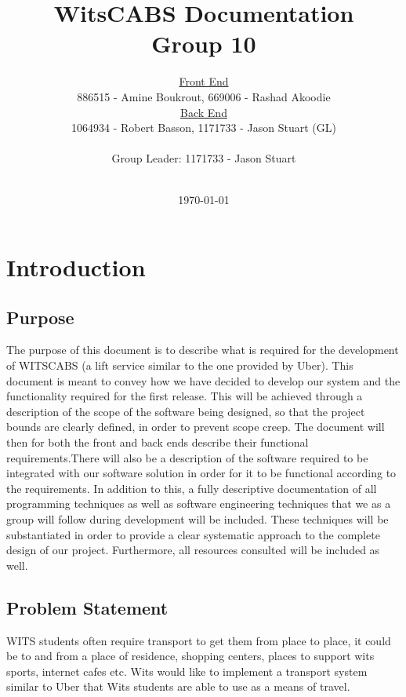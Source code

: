 \documentclass[a4paper,12pt]{article}
\begin{document}
\title{WitsCABS Documentation\\Group 10}
\author{\underline{Front End} \\886515 - Amine Boukrout, 669006 - Rashad Akoodie\\\underline{Back End}\\1064934 - Robert Basson, 1171733 - Jason Stuart (GL)\\ \\ Group Leader: 1171733 - Jason Stuart\\ \\}
\date{\today}
\maketitle
\newpage
\tableofcontents
\newpage
\section{Introduction}
\subsection{Purpose}
The purpose of this document is to describe what is required for the development of WITSCABS (a lift service similar to the one provided by Uber). This document is meant to convey how we have decided to develop our system and the functionality required for the first release. This will be achieved through a description of the scope of the software being designed, so that the project bounds are clearly defined, in order to prevent scope creep. The document will then for both the front and back ends describe their functional requirements.There will also be a description of the software required to be integrated with our software solution in order for it to be functional according to the requirements. 
In addition to this, a fully descriptive documentation of all programming techniques as well as software engineering techniques that we as a group will follow during development will be included. These techniques will be substantiated in order to provide a clear systematic approach to the complete design of our project. Furthermore, all resources consulted will be included as well.
\subsection{Problem Statement}
WITS students often require transport to get them from place to place, it could be to and from a place of residence, shopping centers, places to support wits sports, internet cafes etc. Wits would like to implement a transport system similar to Uber that Wits students are able to use as a means of travel.
\end{document}

